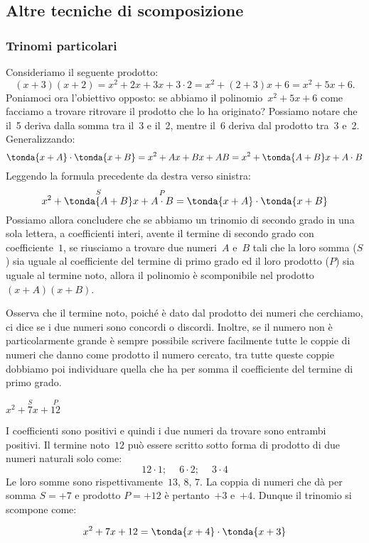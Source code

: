 

\subsection{Altre tecniche di scomposizione}
\label{subsec:divpol_altretecniche}

\subsubsection{Trinomi particolari}
\label{subsubsec:trinpart}

Consideriamo il seguente prodotto:
\[(x+3)(x+2)=x^2+2x+3x+3 \cdot 2=x^2+(2+3)x+6=x^2+5x+6.\]
Poniamoci ora l'obiettivo opposto: se abbiamo il
polinomio~\(x^2+5x+6\) come facciamo a trovare ritrovare il prodotto
che lo ha originato? Possiamo notare che il~5 deriva dalla somma tra
il~3 e il~2, mentre il~6 deriva dal prodotto tra~3 e~2. Generalizzando:
\[\tonda{x+A}\cdot \tonda{x+B}=
  x^{{2}}+Ax+Bx+AB=x^2+\tonda{A+B}x+A\cdot B\]
Leggendo la formula precedente da destra verso sinistra:
\[x^{{2}}+\overset{S}{\tonda{A+B}}x+\overset{P}{A \cdot B}
=\tonda{x+A}\cdot\tonda{x+B}\]
Possiamo allora concludere che se abbiamo un trinomio di secondo grado
in una sola lettera, a coefficienti interi, avente il termine di
secondo grado con coefficiente~\(1\), se riusciamo a trovare due numeri~\(A\) 
e~\(B\) tali che la loro somma (\(S\)) sia uguale al
coefficiente del termine di primo grado ed il loro prodotto (\(P\)) sia 
uguale al termine noto, allora il polinomio è scomponibile nel 
prodotto~\((x+A)(x+B)\).

Osserva che il termine noto, poiché è dato dal prodotto dei numeri
che cerchiamo, ci dice se i due numeri sono concordi o discordi.
Inoltre, se il numero non è particolarmente grande è sempre
possibile scrivere facilmente tutte le coppie di numeri che danno come
prodotto il numero cercato, tra tutte queste coppie dobbiamo poi
individuare quella che ha per somma il coefficiente del termine di
primo grado.

 \begin{esempio}
 \(x^2+\overset{S}{7}x+\overset{P}{12}\)

I coefficienti sono positivi e quindi i due numeri da trovare sono
entrambi positivi.
Il termine noto~\(12\) può essere scritto sotto forma di prodotto di due
numeri naturali solo come:
\[12\cdot 1;\quad~6\cdot 2;\quad~3\cdot 4\]
Le loro somme sono rispettivamente~\(13\), \(8\), \(7\). 
La coppia di numeri che dà per somma \(S=+7\) e prodotto \(P=+12\) è 
pertanto~\(+3\) e~\(+4\). 
Dunque il trinomio si scompone come:

\[x^2+7x+12=\tonda{x+4} \cdot \tonda{x+3}\]
 \end{esempio}

